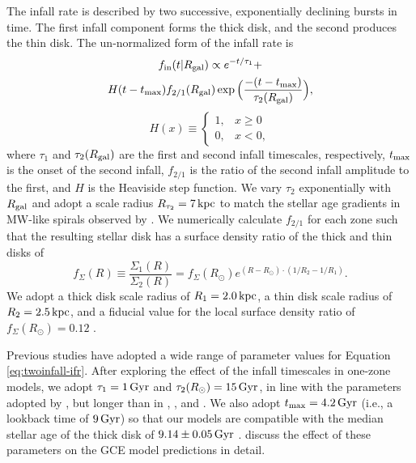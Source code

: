 \documentclass[twocolumn,twocolappendix,linenumbers]{aastex631}
\newcommand{\kpc}{\,{\rm kpc}}
\newcommand{\Gyr}{\,{\rm Gyr}}
\begin{document}
The infall rate is described by two successive, exponentially declining bursts in time. The first infall component forms the thick disk, and the second produces the thin disk. The un-normalized form of the infall rate is
\begin{multline}
    \label{eq:twoinfall-ifr}
    f_{\rm in}(t|R_{\rm gal}) \propto e^{-t/\tau_1} + \\ H(t-t_{\rm max}) f_{2/1} (R_{\rm gal}) \exp\Big(\frac{-(t-t_{\rm max})}{\tau_2(R_{\rm gal})}\Big),
\end{multline}
\begin{equation*}
    H(x) \equiv 
    \begin{cases}
        1, & x \ge 0 \\
        0, & x < 0,
    \end{cases}
\end{equation*}
where $\tau_1$ and $\tau_2(R_{\rm gal})$ are the first and second infall timescales, respectively, $t_{\rm max}$ is the onset of the second infall, $f_{2/1}$ is the ratio of the second infall amplitude to the first, and $H$ is the Heaviside step function. We vary $\tau_2$ exponentially with $R_{\rm gal}$ and adopt a scale radius $R_{\tau_2}=7\kpc$ to match the stellar age gradients in MW-like spirals observed by \citet{sanchez_spatially_2020}. We numerically calculate $f_{2/1}$ for each zone such that the resulting stellar disk has a surface density ratio of the thick and thin disks of
\begin{equation}
    f_\Sigma(R) \equiv \frac{\Sigma_1(R)}{\Sigma_2(R)} = f_\Sigma(R_\odot) e^{(R-R_\odot)\cdot(1/R_2 - 1/R_1)}.
\end{equation}
We adopt a thick disk scale radius of $R_1=2.0\kpc$, a thin disk scale radius of $R_2=2.5\kpc$, and a fiducial value for the local surface density ratio of $f_\Sigma(R_\odot)=0.12$ \citep{bland-hawthorn_galaxy_2016}. 

Previous studies have adopted a wide range of parameter values for Equation \ref{eq:twoinfall-ifr}. After exploring the effect of the infall timescales in one-zone models, we adopt $\tau_1=1\Gyr$ and $\tau_2(R_\odot)=15\Gyr$, in line with the parameters adopted by \citet{spitoni_galactic_2020}, but longer than in \citet{nissen_high-precision_2020}, \citet{spitoni_apogee_2021}, and \citet{hegedus_reconstructing_2025}. We also adopt $t_{\rm max}=4.2\Gyr$ (i.e., a lookback time of $9\Gyr$) so that our models are compatible with the median stellar age of the thick disk of $9.14\pm0.05\Gyr$ \citep{pinsonneault_apokasc-3_2025}. \citet{spitoni_galactic_2019} discuss the effect of these parameters on the GCE model predictions in detail.
\end{document}
